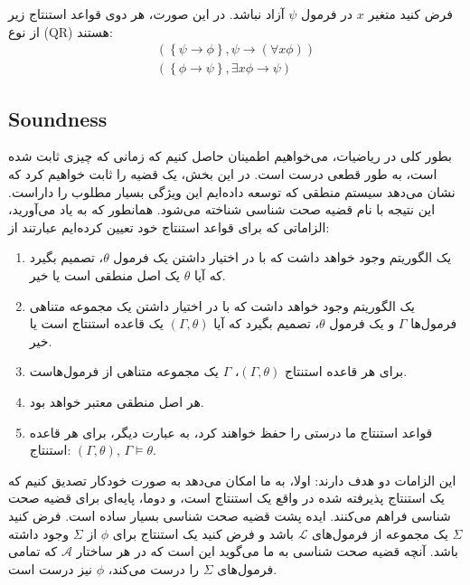 \documentclass[10pt,a4paper]{article}
\newcommand{\curveL}{\mathcal{L}}
\newcommand{\curveA}{\mathcal{A}}
\begin{document}
\begin{define}
فرض کنید متغیر $x$ در فرمول $\psi$ آزاد نباشد. در این صورت، هر دوی قواعد استنتاج زیر از نوع (QR) هستند:
                                \begin{align}
                                    \left(\left\{
                                        \psi\rightarrow\phi
                                    \right\}, \psi \rightarrow (\forall x \phi)\right)\\
                                    \left(\left\{
                                        \phi\rightarrow\psi
                                    \right\}, \exists x\phi \rightarrow \psi\right)
                                \end{align}
                            \end{define}
                \subsection{Soundness}
                    بطور کلی در ریاضیات، می‌خواهیم اطمینان حاصل کنیم که زمانی که چیزی ثابت شده است، به طور قطعی درست است. در این بخش، یک قضیه را ثابت خواهیم کرد که نشان می‌دهد سیستم منطقی که توسعه داده‌ایم این ویژگی بسیار مطلوب را داراست. این نتیجه با نام قضیه صحت شناسی شناخته می‌شود. همانطور که به یاد می‌آورید، الزاماتی که برای قواعد استنتاج خود تعیین کرده‌ایم عبارتند از:
                    \begin{enumerate}
                        \item یک الگوریتم وجود خواهد داشت که با در اختیار داشتن یک فرمول $\theta$، تصمیم بگیرد که آیا $\theta$ یک اصل منطقی است یا خیر.
                        \item یک الگوریتم وجود خواهد داشت که با در اختیار داشتن یک مجموعه متناهی فرمول‌ها $\Gamma$ و یک فرمول $\theta$، تصمیم بگیرد که آیا $(\Gamma, \theta)$ یک قاعده استنتاج است یا خیر.
                        \item برای هر قاعده استنتاج $(\Gamma, \theta)$، $\Gamma$ یک مجموعه متناهی از فرمول‌هاست.
                        \item هر اصل منطقی معتبر خواهد بود.
                        \item قواعد استنتاج ما درستی را حفظ خواهند کرد، به عبارت دیگر، برای هر قاعده استنتاج: $(\Gamma,\theta)$, $\Gamma\vDash \theta$.
                    \end{enumerate}
                    این الزامات دو هدف دارند: اولا، به ما امکان می‌دهد به صورت خودکار تصدیق کنیم که یک استنتاج پذیرفته شده در واقع یک استنتاج است، و دوما، پایه‌ای برای قضیه صحت شناسی فراهم می‌کنند. ایده پشت قضیه صحت شناسی بسیار ساده است. فرض کنید $\Sigma$ یک مجموعه از فرمول‌های $\curveL$ باشد و فرض کنید یک استنتاج برای $\phi$ از $\Sigma$ وجود داشته باشد. آنچه قضیه صحت شناسی به ما می‌گوید این است که در هر ساختار $\curveA$ که تمامی فرمول‌های $\Sigma$ را درست می‌کند، $\phi$ نیز درست است.
\end{document}
